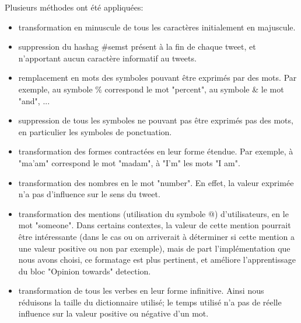 \par Plusieurs méthodes ont été appliquées: \\
\begin{itemize}
  \item transformation en minuscule de tous les caractères initialement en majuscule.
  \item suppression du hashag \#semst présent à la fin de chaque tweet, et n'apportant aucun caractère informatif au tweets.
  \item remplacement en mots des symboles pouvant être exprimés par des mots. Par exemple, au symbole \% correspond le mot "percent", au symbole \& le mot "and", ...
  \item suppression de tous les symboles ne pouvant pas être exprimés pas des mots, en particulier les symboles de ponctuation.
  \item transformation des formes contractées en leur forme étendue. Par exemple, à "ma'am" correspond le mot "madam", à "I'm" les mots "I am".
  \item transformation des nombres en le mot "number". En effet, la valeur exprimée n'a pas d'influence sur le sens du tweet.
  \item transformation des mentions (utilisation du symbole @) d'utilisateurs, en le mot "someone". Dans certains contextes, la valeur de cette mention pourrait être intéressante (dans le cas ou on arriverait à déterminer si cette mention a une valeur positive ou non par exemple), mais de part l'implémentation que nous avons choisi, ce formatage est plus pertinent, et améliore l'apprentissage du bloc "Opinion towards" detection.
  \item transformation de tous les verbes en leur forme infinitive. Ainsi nous réduisons la taille du dictionnaire utilisé; le temps utilisé n'a pas de réelle influence sur la valeur positive ou négative d'un mot.\\
\end{itemize}


